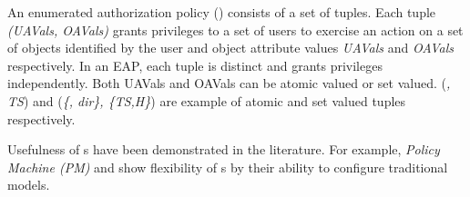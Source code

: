 An enumerated authorization policy (\EAP{}) consists of a set of  tuples.  Each tuple \textit{(UAVals, OAVals)} grants privileges to a set of users  to exercise an action on a set of objects identified by the user and object attribute values \textit{UAVals} and \textit{OAVals} respectively. In an EAP, each tuple is distinct and grants privileges independently. Both  UAVals{} and OAVals{} can be atomic valued or set valued. (\textit{\manager, TS}) and (\textit{\{\manager, dir\}, \{TS,H\}}) are example of atomic and set valued tuples respectively. 
	
Usefulness of \EAP{}s have been demonstrated in the literature. For example, \textit{Policy Machine (PM)} \cite{policy-machine} and \labac{} \cite{labac} show flexibility of \EAP{}s by their ability to configure traditional models. 



